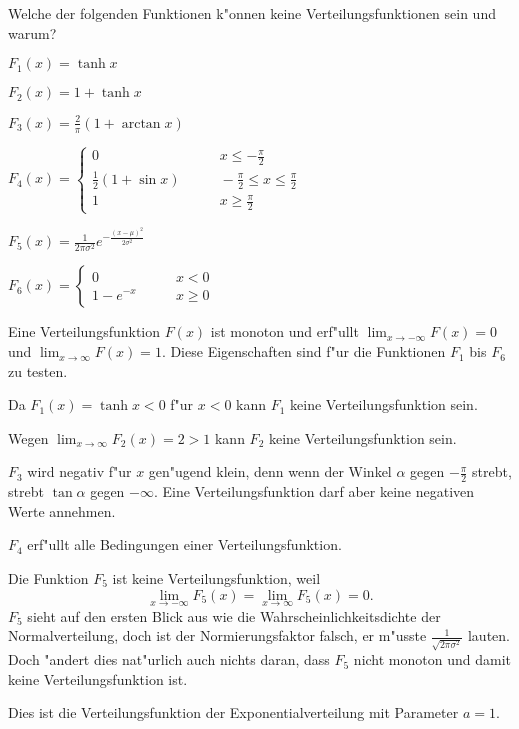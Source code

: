 Welche der folgenden Funktionen k"onnen keine Verteilungsfunktionen sein
und warum?
\begin{teilaufgaben}
\item $F_1(x)=\tanh x$
\item $F_2(x)=1+\tanh x$
\item $F_3(x)=\frac2{\pi}(1+\arctan x)$
\item $F_4(x)=\begin{cases}
0&\qquad x\le -\frac{\pi}2\\
\frac12(1+\sin x)&\qquad-\frac{\pi}2\le x\le \frac{\pi}2\\
1&\qquad x\ge \frac{\pi}2
\end{cases}$
\item $F_5(x)=\frac1{2\pi\sigma^2}e^{-\frac{(x-\mu)^2}{2\sigma^2}}$
\item $F_6(x)=\begin{cases}0&\qquad x<0\\1-e^{-x}&\qquad x\ge 0\end{cases}$
\end{teilaufgaben}

\begin{loesung}
Eine Verteilungsfunktion $F(x)$ ist monoton und erf"ullt
$\lim_{x\to-\infty}F(x)=0$
und
$\lim_{x\to\infty}F(x)=1$. Diese Eigenschaften sind f"ur die
Funktionen $F_1$ bis $F_6$ zu testen.
\begin{teilaufgaben}
\item Da $F_1(x)=\tanh x<0$ f"ur $x<0$ kann $F_1$ keine Verteilungsfunktion sein.
\item Wegen $\lim_{x\to\infty}F_2(x)=2>1$ kann $F_2$ keine Verteilungsfunktion sein.
\item $F_3$ wird negativ f"ur $x$ gen"ugend klein, denn wenn der Winkel
$\alpha$ gegen $-\frac{\pi}2$ strebt, strebt $\tan\alpha$ gegen $-\infty$.
Eine Verteilungsfunktion darf aber keine negativen Werte annehmen.
\item $F_4$ erf"ullt alle Bedingungen einer Verteilungsfunktion.
\item Die Funktion $F_5$ ist keine Verteilungsfunktion, weil
\[
\lim_{x\to-\infty}F_5(x)=\lim_{x\to\infty}F_5(x)=0.
\]
$F_5$ sieht auf den ersten
Blick aus wie die Wahrscheinlichkeitsdichte der Normalverteilung, doch ist
der Normierungsfaktor falsch, er m"usste $\frac1{\sqrt{2\pi\sigma^2}}$ lauten.
Doch "andert dies nat"urlich auch nichts daran, dass $F_5$ nicht monoton und damit
keine Verteilungsfunktion ist.
\item Dies ist die Verteilungsfunktion der Exponentialverteilung mit Parameter $a=1$.
\end{teilaufgaben}
\end{loesung}

